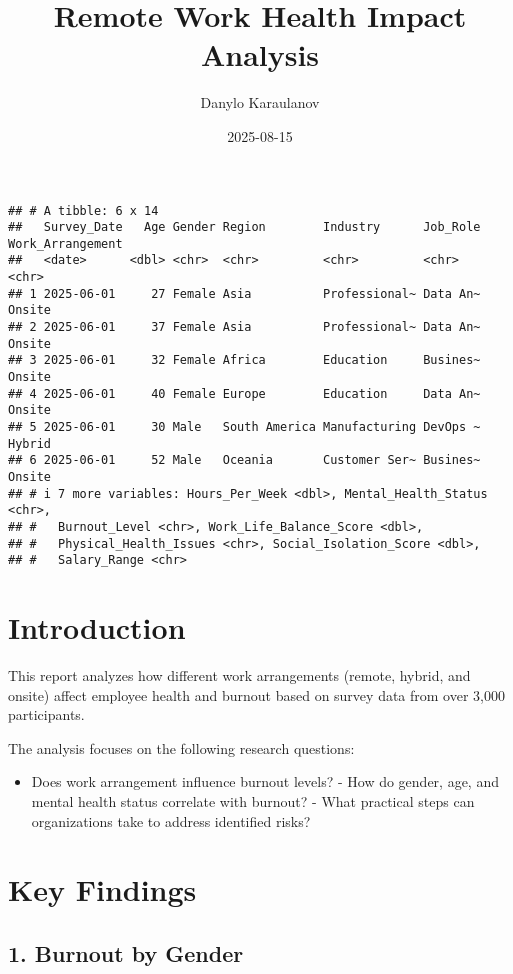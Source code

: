 \documentclass[
]{article}
\title{Remote Work Health Impact Analysis}
\author{Danylo Karaulanov}
\date{2025-08-15}
\providecommand{\tightlist}{%
  \setlength{\itemsep}{0pt}\setlength{\parskip}{0pt}}
\begin{document}
\maketitle

\begin{verbatim}
## # A tibble: 6 x 14
##   Survey_Date   Age Gender Region        Industry      Job_Role Work_Arrangement
##   <date>      <dbl> <chr>  <chr>         <chr>         <chr>    <chr>           
## 1 2025-06-01     27 Female Asia          Professional~ Data An~ Onsite          
## 2 2025-06-01     37 Female Asia          Professional~ Data An~ Onsite          
## 3 2025-06-01     32 Female Africa        Education     Busines~ Onsite          
## 4 2025-06-01     40 Female Europe        Education     Data An~ Onsite          
## 5 2025-06-01     30 Male   South America Manufacturing DevOps ~ Hybrid          
## 6 2025-06-01     52 Male   Oceania       Customer Ser~ Busines~ Onsite          
## # i 7 more variables: Hours_Per_Week <dbl>, Mental_Health_Status <chr>,
## #   Burnout_Level <chr>, Work_Life_Balance_Score <dbl>,
## #   Physical_Health_Issues <chr>, Social_Isolation_Score <dbl>,
## #   Salary_Range <chr>
\end{verbatim}

\section{\texorpdfstring{\textbf{Introduction}}{Introduction}}\label{introduction}

This report analyzes how different work arrangements (remote, hybrid,
and onsite) affect employee health and burnout based on survey data from
over 3,000 participants.

The analysis focuses on the following research questions:

\begin{itemize}
\tightlist
\item
  Does work arrangement influence burnout levels? - How do gender, age,
  and mental health status correlate with burnout? - What practical
  steps can organizations take to address identified risks?
\end{itemize}

\section{\texorpdfstring{\textbf{Key
Findings}}{Key Findings}}\label{key-findings}

\subsection{\texorpdfstring{\textbf{1. Burnout by
Gender}}{1. Burnout by Gender}}\label{burnout-by-gender}
\end{document}
